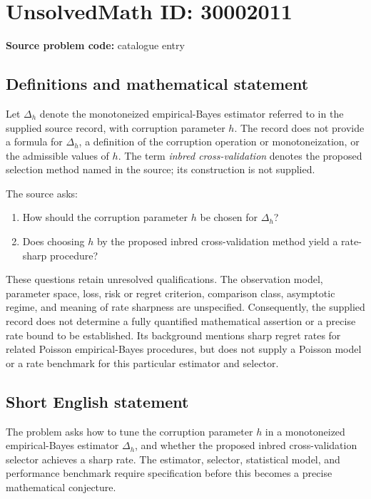 \documentclass[11pt]{article}
\begin{document}
\section*{UnsolvedMath ID: 30002011}
\textbf{Source problem code:} catalogue entry
\subsection{Definitions and mathematical statement}
Let \(\Delta_h\) denote the monotoneized empirical-Bayes estimator referred to in the supplied source record, with corruption parameter \(h\). The record does not provide a formula for \(\Delta_h\), a definition of the corruption operation or monotoneization, or the admissible values of \(h\). The term \emph{inbred cross-validation} denotes the proposed selection method named in the source; its construction is not supplied.

The source asks:
\begin{enumerate}
\item How should the corruption parameter \(h\) be chosen for \(\Delta_h\)?
\item Does choosing \(h\) by the proposed inbred cross-validation method yield a rate-sharp procedure?
\end{enumerate}

These questions retain unresolved qualifications. The observation model, parameter space, loss, risk or regret criterion, comparison class, asymptotic regime, and meaning of rate sharpness are unspecified. Consequently, the supplied record does not determine a fully quantified mathematical assertion or a precise rate bound to be established. Its background mentions sharp regret rates for related Poisson empirical-Bayes procedures, but does not supply a Poisson model or a rate benchmark for this particular estimator and selector.
\subsection{Short English statement}
The problem asks how to tune the corruption parameter \(h\) in a monotoneized empirical-Bayes estimator \(\Delta_h\), and whether the proposed inbred cross-validation selector achieves a sharp rate. The estimator, selector, statistical model, and performance benchmark require specification before this becomes a precise mathematical conjecture.
\end{document}
